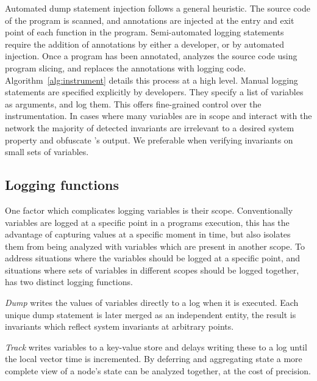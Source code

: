 Automated dump statement injection follows a general heuristic. The
source code of the program is scanned, and annotations are injected at
the entry and exit point of each function in the program.
%
Semi-automated logging statements require the addition of annotations
by either a developer, or by automated injection. Once a program has
been annotated, \dinv analyzes the source code using program slicing,
and replaces the annotations with logging code.
Algorithm~\ref{alg:instrument} details this process at a high level.
%
Manual logging statements are specified explicitly by developers. They
specify a list of variables as arguments, and log them. This offers
fine-grained control over the instrumentation. In cases where many
variables are in scope and interact with the network the majority of
detected invariants are irrelevant to a desired system property and
obfuscate \dinv's output. We preferable when verifying invariants on
small sets of variables.

\subsection{Logging functions}
\label{sec:logging-functions}

One factor which complicates logging variables is their scope.
Conventionally variables are logged at a specific point in a programs
execution, this has the advantage of capturing values at a specific
moment in time, but also isolates them from being analyzed with
variables which are present in another scope. To address situations
where the variables should be logged at a specific point, and
situations where sets of variables in different scopes should be
logged together, \dinv has two distinct logging functions.

\textit{Dump} writes the values of variables directly to a log when it
is executed. Each unique dump statement is later merged as an
independent entity, the result is invariants which reflect system
invariants at arbitrary points. %

\textit{Track} writes variables to a key-value store and delays writing these
to a log until the local vector time is incremented. By deferring and
aggregating state a more complete view of a node's state can be
analyzed together, at the cost of precision.


